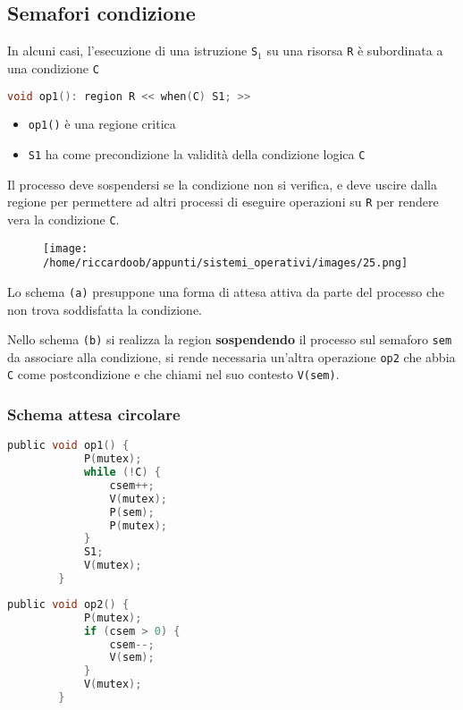 \subsection{Semafori condizione}
In alcuni casi, l'esecuzione di una istruzione \texttt{S}$_1$ su una risorsa \texttt{R} è subordinata a una condizione \texttt{C} 
\begin{lstlisting}[language=C]
    void op1(): region R << when(C) S1; >>
\end{lstlisting}
\begin{itemize}
    \item \texttt{op1()} è una regione critica
    \item \texttt{S1} ha come precondizione la validità della condizione logica \texttt{C}
\end{itemize}

Il processo deve sospendersi se la condizione non si verifica, e deve uscire dalla regione per permettere ad altri processi di eseguire operazioni su \texttt{R} per rendere vera la condizione \texttt{C}.

\begin{figure}[H]
    \centering
    \texttt{[image: /home/riccardoob/appunti/sistemi\_operativi/images/25.png]}
\end{figure}

Lo schema \texttt{(a)} presuppone una forma di attesa attiva da parte del processo che non trova soddisfatta la condizione.

Nello schema \texttt{(b)} si realizza la region \textbf{sospendendo} il processo sul semaforo \texttt{sem} da associare alla condizione, si rende necessaria un'altra operazione \texttt{op2} che abbia \texttt{C} come postcondizione e che chiami nel suo contesto \texttt{V(sem)}.

\vspace{-0.5cm}
\subsubsection{Schema attesa circolare}
\vspace{-0.5cm}
\begin{multicols}{2}
    \begin{lstlisting}[language=C]
        public void op1() {
            P(mutex);
            while (!C) {
                csem++;
                V(mutex);
                P(sem);
                P(mutex);
            }
            S1;
            V(mutex);
        }
    \end{lstlisting}
    \columnbreak
    \begin{lstlisting}[language=C]
        public void op2() {
            P(mutex);
            if (csem > 0) {
                csem--;
                V(sem);
            }
            V(mutex);
        }
    \end{lstlisting}
\end{multicols}

